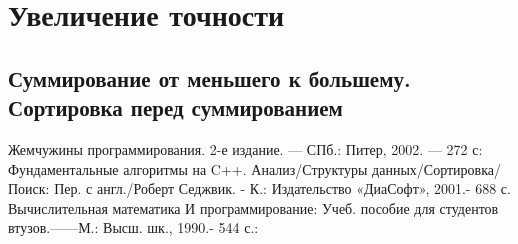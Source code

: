 \documentclass[a4paper, 12pt]{article}
\begin{document}
\section{Увеличение точности}

\subsection{Суммирование от меньшего к большему. Сортировка перед суммированием}

\begin{thebibliography}{99}
    Жемчужины программирования. 2-е издание. — СПб.: Питер, 2002. — 272 с: 
    Фундаментальные алгоритмы на C++. Анализ/Структуры данных/Сортировка/Поиск: Пер. с англ./Роберт Седжвик. - К.: Издательство «ДиаСофт», 2001.- 688 с. 
Вычислительная математика И программирование: Учеб. пособие для студентов втузов.——М.: Высш. шк., 1990.- 544 с.: 
\end{thebibliography}
\end{document}
